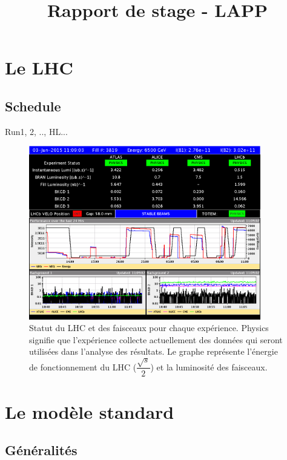 \documentclass[11pt]{article} %
\title{Rapport de stage - LAPP}
\begin{document}
\maketitle


\section{Le LHC}

\subsection{Schedule}
Run1, 2, .., HL...

\begin{figure}[H]
\centering
  \caption{Statut du LHC et des faisceaux pour chaque expérience. \og Physics \fg signifie que l'expérience collecte actuellement des données qui seront utilisées dans l'analyse des résultats.  Le graphe représente l'énergie de fonctionnement du LHC ($\dfrac{\sqrt{s}}{2}$) et la luminosité des faisceaux. }
 \includegraphics[width=0.9\textwidth]{../images/lhc3.png}
\end{figure}

\section{Le modèle standard}

\subsection{Généralités}
\end{document}
